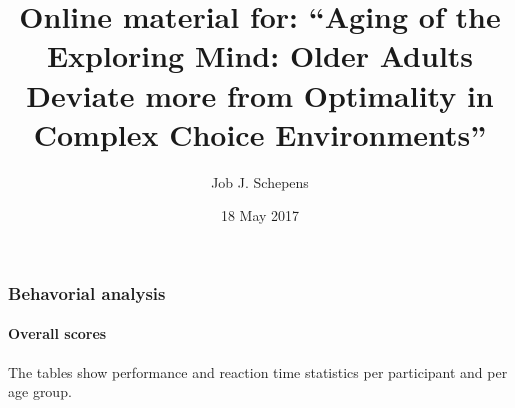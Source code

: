 \documentclass[,]{article}
\title{Online material for: ``Aging of the Exploring Mind: Older Adults Deviate
more from Optimality in Complex Choice Environments''}
\author{Job J. Schepens}
\date{18 May 2017}
\let\oldparagraph\paragraph
\renewcommand{\paragraph}[1]{\oldparagraph{#1}\mbox{}}
\begin{document}
\maketitle

{
\setcounter{tocdepth}{6}
\tableofcontents
}
\newpage

\subsubsection{Behavorial analysis}\label{behavorial-analysis}

\paragraph{Overall scores}\label{overall-scores}

The tables show performance and reaction time statistics per participant
and per age group.

\newpage 
\end{document}
